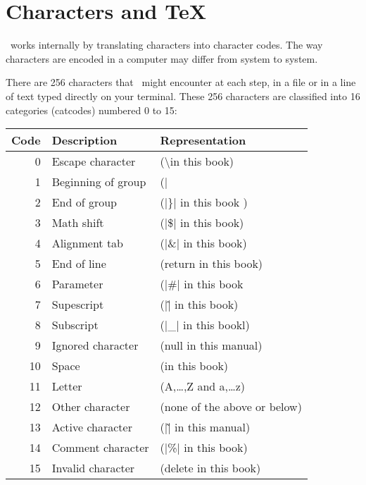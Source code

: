 \chapter{Characters and TeX}
\label{ch:characters}

\normalsize

\tex\ works internally by translating characters into character codes. The way characters are encoded in a computer
may differ from system to system.


There are 256 characters that \tex\  might encounter at
each step, in a file or in a line of text typed directly on your terminal. These
256 characters are classified into 16 categories (catcodes) numbered 0 to 15:



\begin{table}[htbp]
\centering
\begin{tabular}{rll}
\toprule
Code & Description & Representation\\
\midrule
0 & Escape character & (\textbackslash in this book)\\
1 & Beginning of group & (|{| in this book)\\
2 & End of group & (|\}| in this book )\\
3 & Math shift & (|\$| in this book)\\
4 & Alignment tab & (|\&| in this book)\\
5 & End of line &(return in this book)\\
6 & Parameter &(|\#| in this book\\
7 & Supescript &(|\^| in this book)\\
8 & Subscript &(|\_| in this bookl)\\
9 & Ignored character &(null in this manual)\\
10 & Space &(\textvisiblespace in this book)\\
11 &Letter &(A,\ldots,Z and a,\ldots z)\\
12 &Other character &(none of the above or below)\\
13 &Active character &(|\~| in this manual)\\
14 &Comment character &(|\%| in this book)\\
15 &Invalid character &(delete in this book)\\
\bottomrule
\end{tabular}
\end{table}
\medskip

